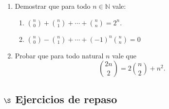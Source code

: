 \documentclass[a4paper,12pt,twoside,spanish,reqno]{amsbook}
\numberwithin{equation}{section}
\begin{document}
\begin {enumerate}
\item Demostrar que para todo $n \in \mathbb N$ vale:
\begin{enumerate}
  \item $\displaystyle{\binom{n}{0} + \binom{n}{1} + \cdots + \binom{n}{n} = 2^n}$.
\medskip
  \item $\displaystyle{\binom{n}{0} - \binom{n}{1} + \cdots + (-1)^n\binom{n}{n} = 0}$
  \end{enumerate}


\item Probar que para todo natural $n$ vale que 
\begin{equation*}
    \binom{2n}{2} = 2 \binom{n}{2} + n^2.
\end{equation*}

\end{enumerate}



\subsection*{$\S$  Ejercicios de repaso}
\end{document}
